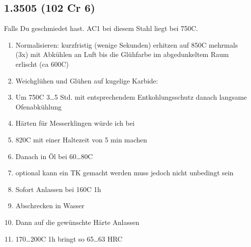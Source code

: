 \documentclass[a4paper]{scrartcl} %
\begin{document}
\subsection{1.3505 (102 Cr 6)}
Falls Du geschmiedet hast. AC1 bei diesem Stahl liegt bei 750{\degree}C.
\begin{enumerate}

\item Normalisieren:
kurzfristig (wenige Sekunden) erhitzen auf 850{\degree}C mehrmals (3x) mit Abkühlen an Luft bis die Glühfarbe im abgedunkeltem Raum erlischt (ca 600{\degree}C)

\item Weichglühen und Glühen auf kugelige Karbide:
\item Um 750{\degree}C 3{\ldots}5 Std. mit entsprechendem Entkohlungsschutz danach langsame Ofenabkühlung

\item Härten für Messerklingen würde ich bei

\item 820{\degree}C mit einer Haltezeit von 5 min machen
\item Danach in Öl bei 60{\ldots}80{\degree}C

\item optional kann ein TK gemacht werden muss jedoch nicht unbedingt sein

\item Sofort Anlassen bei 160{\degree}C 1h
\item Abschrecken in Wasser
\item Dann auf die gewünschte Härte Anlassen
\item 170{\ldots}200{\degree}C 1h bringt so 65{\ldots}63 HRC 
\end{enumerate}
\end{document}
